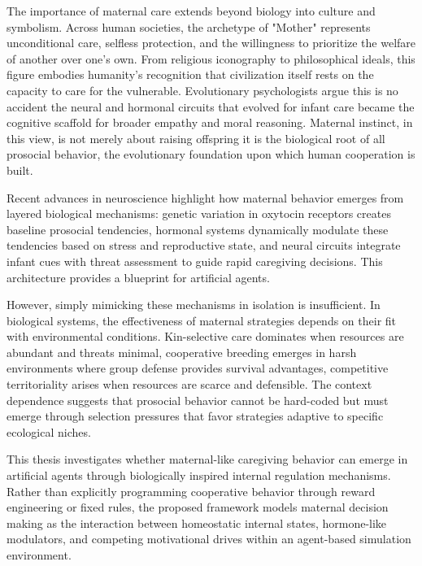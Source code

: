 The importance of maternal care extends beyond biology into culture and symbolism. Across human societies, the archetype of "Mother" represents unconditional care, selfless protection, and the willingness to prioritize the welfare of another over one's own. From religious iconography to philosophical ideals, this figure embodies humanity's recognition that civilization itself rests on the capacity to care for the vulnerable. Evolutionary psychologists argue this is no accident the neural and hormonal circuits that evolved for infant care became the cognitive scaffold for broader empathy and moral reasoning. Maternal instinct, in this view, is not merely about raising offspring it is the biological root of all prosocial behavior, the evolutionary foundation upon which human cooperation is built. 



Recent advances in neuroscience highlight how maternal behavior emerges from layered biological mechanisms: genetic variation in oxytocin receptors creates baseline prosocial tendencies, hormonal systems dynamically modulate these tendencies based on stress and reproductive state, and neural circuits integrate infant cues with threat assessment to guide rapid caregiving decisions. This architecture provides a blueprint for artificial agents.

However, simply mimicking these mechanisms in isolation is insufficient. In biological systems, the effectiveness of maternal strategies depends on their fit with environmental conditions. Kin-selective care dominates when resources are abundant and threats minimal, cooperative breeding emerges in harsh environments where group defense provides survival advantages, competitive territoriality arises when resources are scarce and defensible. The context dependence suggests that prosocial behavior cannot be hard-coded but must emerge through selection pressures that favor strategies adaptive to specific ecological niches.



This thesis investigates whether maternal-like caregiving behavior can emerge in artificial agents through biologically inspired internal regulation mechanisms. Rather than explicitly programming cooperative behavior through reward engineering or fixed rules, the proposed framework models maternal decision making as the interaction between homeostatic internal states, hormone-like modulators, and competing motivational drives within an agent-based simulation environment.

